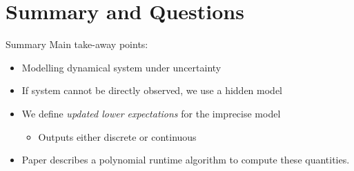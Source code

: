 \documentclass{beamer}
\begin{document}
\section{Summary and Questions}

\begin{frame}{Summary}
Main take-away points:
\begin{itemize}
\item Modelling dynamical system under uncertainty
\item If system cannot be directly observed, we use a hidden model \\ \quad
\item We define \emph{updated lower expectations} for the imprecise model
\begin{itemize}
\item Outputs either discrete or continuous
\end{itemize}
\item Paper describes a polynomial runtime algorithm to compute these quantities.
\end{itemize}
\end{frame}
\end{document}
